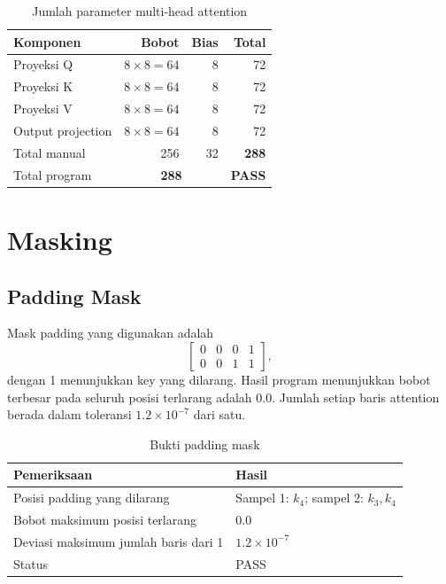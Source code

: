\documentclass[12pt,a4paper]{article}
\begin{document}
\begin{table}[H]
    \centering
    \caption{Jumlah parameter multi-head attention}
    \label{tab:mha-parameters}
    \renewcommand{\arraystretch}{1.25}
    \begin{tabular}{l r r r}
        \toprule
        Komponen & Bobot & Bias & Total \\
        \midrule
        Proyeksi Q & $8\times8=64$ & 8 & 72 \\
        Proyeksi K & $8\times8=64$ & 8 & 72 \\
        Proyeksi V & $8\times8=64$ & 8 & 72 \\
        Output projection & $8\times8=64$ & 8 & 72 \\
        \midrule
        Total manual & 256 & 32 & \textbf{288} \\
        Total program & \multicolumn{2}{c}{\textbf{288}} & \textbf{PASS} \\
        \bottomrule
    \end{tabular}
\end{table}

\section{Masking}

\subsection{Padding Mask}
Mask padding yang digunakan adalah
\[
\begin{bmatrix}
0&0&0&1\\
0&0&1&1
\end{bmatrix},
\]
dengan 1 menunjukkan key yang dilarang. Hasil program menunjukkan bobot
terbesar pada seluruh posisi terlarang adalah $0.0$. Jumlah setiap baris
attention berada dalam toleransi $1.2\times10^{-7}$ dari satu.

\begin{table}[H]
    \centering
    \caption{Bukti padding mask}
    \label{tab:padding-mask}
    \begin{tabular}{l l}
        \toprule
        Pemeriksaan & Hasil \\
        \midrule
        Posisi padding yang dilarang & Sampel 1: $k_4$; sampel 2: $k_3,k_4$ \\
        Bobot maksimum posisi terlarang & 0.0 \\
        Deviasi maksimum jumlah baris dari 1 & $1.2\times10^{-7}$ \\
        Status & PASS \\
        \bottomrule
    \end{tabular}
\end{table}
\end{document}
